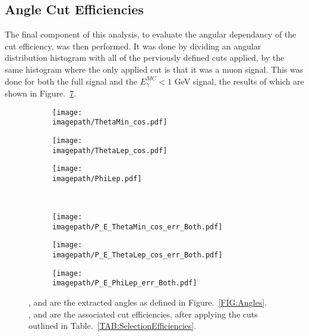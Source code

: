 \subsection{Angle Cut Efficiencies}
\label{SUBSEC:AngleCutEfficiencies}
The final component of this analysis, to evaluate the angular dependancy of the cut efficiency, was then performed. It was done by dividing an angular distribution histogram with all of the perviously defined cuts applied, by the same histogram where the only applied cut is that it was a muon signal. This was done for both the full signal and the ${E}_{\gamma}^{MC} < 1$ GeV signal, the results of which are shown in Figure.~\ref{FIG:AngleEfficiencies}.
\\
\begin{figure}
    \begin{subfigure}[t]{0.32\textwidth}
        \texttt{[image: \\imagepath/ThetaMin\_cos.pdf]}
        \caption{}
        \label{SUBFIG:ThetaMin}
    \end{subfigure}
    \begin{subfigure}[t]{0.32\textwidth}
        \texttt{[image: \\imagepath/ThetaLep\_cos.pdf]}
        \caption{}
        \label{SUBFIG:ThetaLep}
    \end{subfigure}
    \begin{subfigure}[t]{0.32\textwidth}
        \texttt{[image: \\imagepath/PhiLep.pdf]}
        \caption{}
        \label{SUBFIG:PhiLep}
    \end{subfigure}\\
    \begin{subfigure}[t]{0.32\textwidth}
        \texttt{[image: \\imagepath/P\_E\_ThetaMin\_cos\_err\_Both.pdf]}
        \caption{}
        \label{SUBFIG:ThetaMinError}
    \end{subfigure}
    \begin{subfigure}[t]{0.32\textwidth}
        \texttt{[image: \\imagepath/P\_E\_ThetaLep\_cos\_err\_Both.pdf]}
        \caption{}
        \label{SUBFIG:ThetaLepError}
    \end{subfigure}
    \begin{subfigure}[t]{0.32\textwidth}
        \texttt{[image: \\imagepath/P\_E\_PhiLep\_err\_Both.pdf]}
        \caption{}
        \label{SUBFIG:PhiLepError}
    \end{subfigure}
    \caption{
    ,  and  are the extracted angles as defined in Figure.~\ref{FIG:Angles}. \\
    ,  and  are the associated cut efficiencies, after applying the cuts outlined in Table.~\ref{TAB:SelectionEfficiencies}.
    }
    \label{FIG:AngleEfficiencies}
\end{figure}

